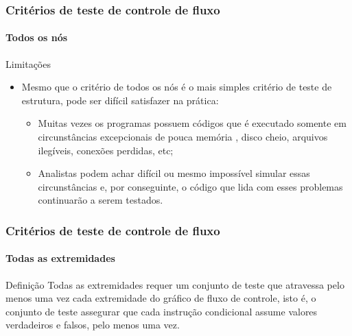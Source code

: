 \begin{frame}
\frametitle{Critérios de teste de controle de fluxo}
\framesubtitle{Todos os nós}

\begin{block:fact}{Limitações}
\begin{itemize}
	\item Mesmo que o critério de todos os nós é o mais simples critério de teste 
	de estrutura, pode ser difícil satisfazer na prática:
	\begin{itemize}
		\item Muitas vezes os programas possuem códigos que é executado somente em circunstâncias
		excepcionais de pouca memória , disco cheio, arquivos ilegíveis, conexões 
		perdidas, etc;

		\item Analistas podem achar difícil ou mesmo impossível simular
		essas circunstâncias e, por conseguinte, o código que lida com esses problemas continuarão
		a serem testados.
	\end{itemize}
\end{itemize}
\end{block:fact}
\end{frame}



\begin{frame}
\label{concept:all-edges-criterion}
\label{concept:all-edges}
\frametitle{Critérios de teste de controle de fluxo}
\framesubtitle{Todas as extremidades}


\begin{block:concept}{Definição}
Todas as extremidades requer um conjunto de teste que atravessa pelo menos uma vez cada extremidade
do gráfico de fluxo de controle, isto é, o conjunto de teste assegurar que cada
instrução condicional assume valores verdadeiros e falsos, pelo menos uma vez.
\end{block:concept}
\end{frame}


